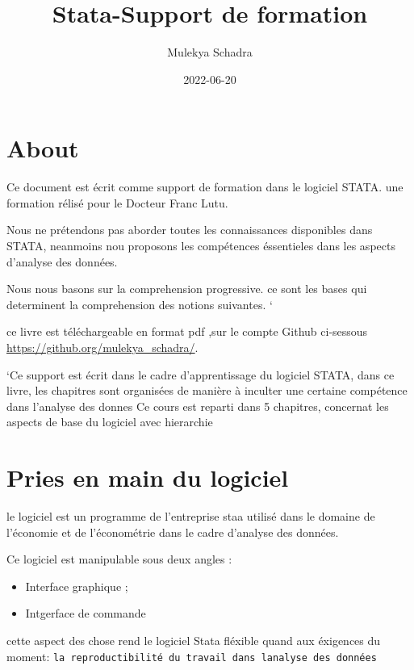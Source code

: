 \documentclass[
]{book}
\title{Stata-Support de formation}
\author{Mulekya Schadra}
\date{2022-06-20}
\providecommand{\tightlist}{%
  \setlength{\itemsep}{0pt}\setlength{\parskip}{0pt}}
\begin{document}
\maketitle

{
\setcounter{tocdepth}{1}
\tableofcontents
}
\hypertarget{about}{%
\chapter*{About}\label{about}}

Ce document est écrit comme support de formation dans le logiciel STATA. une formation rélisé pour le Docteur Franc Lutu.

Nous ne prétendons pas aborder toutes les connaissances disponibles dans STATA,
neanmoins nou proposons les compétences éssentieles dans les aspects d'analyse des données.

Nous nous basons sur la comprehension progressive. ce sont les bases qui determinent la comprehension des notions suivantes. `

ce livre est téléchargeable en format pdf ,sur le compte Github ci-sessous \url{https://github.org/mulekya_schadra/}.

`Ce support est écrit dans le cadre d'apprentissage du logiciel STATA, dans ce livre, les chapitres sont organisées de manière à inculter une certaine compétence dans l'analyse des donnes
Ce cours est reparti dans 5 chapitres, concernat les aspects de base du logiciel avec hierarchie

\hypertarget{pries-en-main-du-logiciel}{%
\chapter{Pries en main du logiciel}\label{pries-en-main-du-logiciel}}

le logiciel est un programme de l'entreprise staa utilisé dans le domaine de l'économie et de l'économétrie dans le cadre d'analyse des données.

Ce logiciel est manipulable sous deux angles :

\begin{itemize}
\tightlist
\item
  Interface graphique ;
\item
  Intgerface de commande
\end{itemize}

cette aspect des chose rend le logiciel Stata fléxible quand aux éxigences du moment: \texttt{la\ reproductibilité\ du\ travail\ dans\ l\textquotesingle{}analyse\ des\ données}
\end{document}

